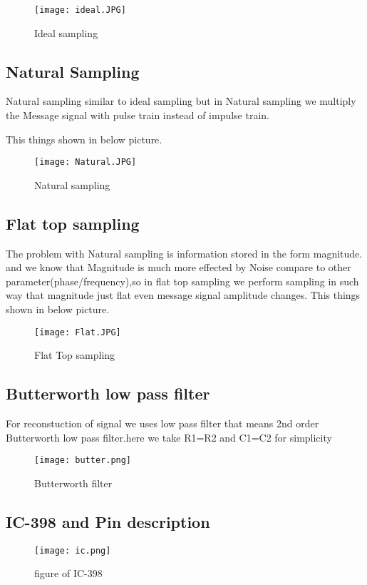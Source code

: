 \documentclass{article}
\begin{document}
 
\begin{figure}[h]
	\centering
	\texttt{[image: ideal.JPG]}
	\caption{Ideal sampling}
	\label{ideal}
\end{figure}


\subsection{Natural Sampling}
Natural sampling similar to ideal sampling but in Natural sampling we multiply the Message signal with pulse train instead of impulse train.

This things shown in below picture.
\begin{figure*}[h]
	\centering
	\texttt{[image: Natural.JPG]}
	\caption{Natural sampling}
	\label{Natural}
\end{figure*}


\subsection{Flat top sampling}
The problem with Natural sampling is information stored in the form magnitude. and we know that Magnitude is much more effected by Noise compare to other parameter(phase/frequency),so in flat top sampling
we perform sampling in such way that magnitude just flat even message signal amplitude changes.
This things shown in below picture. 
\begin{figure*}[h]
	\centering
	\texttt{[image: Flat.JPG]}
	\caption{Flat Top sampling}
	\label{Flat}
\end{figure*}
\subsection{Butterworth low pass filter}
  For reconstuction of signal we uses low pass filter that means 2nd order Butterworth low pass filter.here we take R1=R2 and C1=C2 for simplicity
  
\begin{figure*}[ht]
	\centering
	\texttt{[image: butter.png]}
	\caption{ Butterworth filter}
	\label{butt}
\end{figure*}
  
\subsection{IC-398 and Pin description}

 
\begin{figure*}[ht]
	\centering
	\texttt{[image: ic.png]}
	\caption{ figure of IC-398}
	\label{pin}
\end{figure*}
\end{document}
